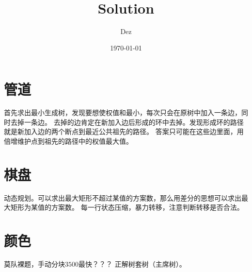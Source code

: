 \documentclass{article}
\title{Solution}
\author{Dez}
\date{\today}
\begin{document}
\maketitle

\section{管道}
首先求出最小生成树，发现要想使权值和最小，每次只会在原树中加入一条边，同时去掉一条边。
去掉的边肯定在新加入边后形成的环中去掉。发现形成环的路径就是新加入边的两个断点到最近公共祖先的路径。
答案只可能在这些边里面，用倍增维护点到祖先的路径中的权值最大值。

\section{棋盘}
动态规划。可以求出最大矩形不超过某值的方案数，那么用差分的思想可以求出最大矩形为某值的方案数。
每一行状态压缩，暴力转移，注意判断转移是否合法。

\section{颜色}
莫队裸题，手动分块$3500$最快？？？
正解树套树（主席树）。
\end{document}
